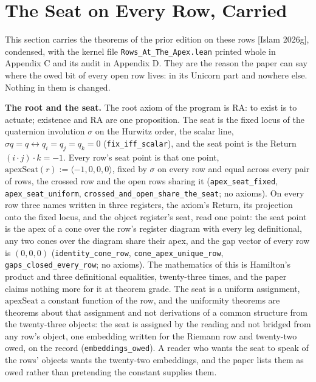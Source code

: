 \documentclass[10pt,twocolumn]{article}
\begin{document}
\hypertarget{the-seat-on-every-row-carried}{%
\section{The Seat on Every Row,
Carried}\label{the-seat-on-every-row-carried}}

This section carries the theorems of the prior edition on these rows
{[}Islam 2026g{]}, condensed, with the kernel file
\texttt{Rows\_At\_The\_Apex.lean} printed whole in Appendix C and its
audit in Appendix D. They are the reason the paper can say where the
owed bit of every open row lives: in its Unicorn part and nowhere else.
Nothing in them is changed.

\textbf{The root and the seat.} The root axiom of the program is
\(\mathrm{RA}\): to exist is to actuate; existence and \(\mathrm{RA}\)
are one proposition. The seat is the fixed locus of the quaternion
involution \(\sigma\) on the Hurwitz order, the scalar line,
\(\sigma q = q \leftrightarrow q_i = q_j = q_k = 0\)
(\texttt{fix\_iff\_scalar}), and the seat point is the Return
\((i \cdot j)\cdot k = -1\). Every row's seat point is that one point,
\(\mathrm{apexSeat}(r) := \langle -1, 0, 0, 0\rangle\), fixed by
\(\sigma\) on every row and equal across every pair of rows, the crossed
row and the open rows sharing it (\texttt{apex\_seat\_fixed},
\texttt{apex\_seat\_uniform},
\texttt{crossed\_and\_open\_share\_the\_seat}; no axioms). On every row
three names written in three registers, the axiom's Return, its
projection onto the fixed locus, and the object register's seat, read
one point: the seat point is the apex of a cone over the row's register
diagram with every leg definitional, any two cones over the diagram
share their apex, and the gap vector of every row is \((0, 0, 0)\)
(\texttt{identity\_cone\_row}, \texttt{cone\_apex\_unique\_row},
\texttt{gaps\_closed\_every\_row}; no axioms). The mathematics of this
is Hamilton's product and three definitional equalities, twenty-three
times, and the paper claims nothing more for it at theorem grade. The
seat is a uniform assignment, \(\mathrm{apexSeat}\) a constant function
of the row, and the uniformity theorems are theorems about that
assignment and not derivations of a common structure from the
twenty-three objects: the seat is assigned by the reading and not
bridged from any row's object, one embedding written for the Riemann row
and twenty-two owed, on the record (\texttt{embeddings\_owed}). A reader
who wants the seat to speak of the rows' objects wants the twenty-two
embeddings, and the paper lists them as owed rather than pretending the
constant supplies them.
\end{document}
